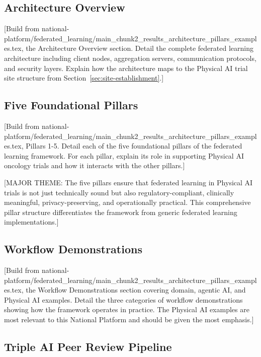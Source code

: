 \subsection{Architecture Overview}
\label{subsec:fl-architecture}

[Build from national-platform/federated\_learning/main\_chunk2\_results\_architecture\_pillars\_examples.tex,
the Architecture Overview section. Detail the complete federated learning
architecture including client nodes, aggregation servers, communication
protocols, and security layers. Explain how the architecture maps to the
Physical AI trial site structure from Section~\ref{sec:site-establishment}.]

\subsection{Five Foundational Pillars}
\label{subsec:fl-pillars}

[Build from national-platform/federated\_learning/main\_chunk2\_results\_architecture\_pillars\_examples.tex,
Pillars 1-5. Detail each of the five foundational pillars of the federated
learning framework. For each pillar, explain its role in supporting
Physical AI oncology trials and how it interacts with the other pillars.]

[MAJOR THEME: The five pillars ensure that federated learning in Physical AI
trials is not just technically sound but also regulatory-compliant,
clinically meaningful, privacy-preserving, and operationally practical.
This comprehensive pillar structure differentiates the framework from
generic federated learning implementations.]

\subsection{Workflow Demonstrations}
\label{subsec:fl-workflows}

[Build from national-platform/federated\_learning/main\_chunk2\_results\_architecture\_pillars\_examples.tex,
the Workflow Demonstrations section covering domain, agentic AI, and Physical AI
examples. Detail the three categories of workflow demonstrations showing how
the framework operates in practice. The Physical AI examples are most relevant
to this National Platform and should be given the most emphasis.]

\subsection{Triple AI Peer Review Pipeline}
\label{subsec:fl-peer-review}


